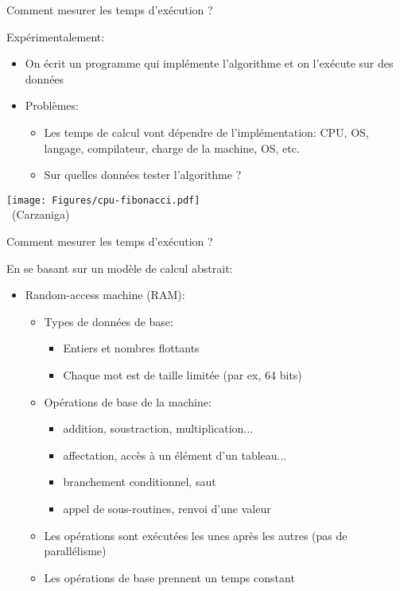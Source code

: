 \begin{frame}{Comment mesurer les temps d'exécution ?}

Expérimentalement:
\begin{itemize}
\item On écrit un programme qui implémente l'algorithme et on l'exécute sur des données
\item Problèmes:
\begin{itemize}
\item Les temps de calcul vont dépendre de l'implémentation: CPU, OS, langage, compilateur, charge de la machine, OS, etc.
\item Sur quelles données tester l'algorithme ?
\end{itemize}
\end{itemize}

\begin{center}
\texttt{[image: Figures/cpu-fibonacci.pdf]}\\
~\hfill\scriptsize(Carzaniga)
\end{center}

\end{frame}

\begin{frame}{Comment mesurer les temps d'exécution ?}

En se basant sur un modèle de calcul abstrait:
\begin{itemize}
\item Random-access machine (RAM):
\begin{itemize}
\item Types de données de base:
\begin{itemize}
\item Entiers et nombres flottants
\item Chaque mot est de taille limitée (par ex, 64 bits)
\end{itemize}
\item Opérations de base de la machine:
\begin{itemize}
\item addition, soustraction, multiplication...
\item affectation, accès à un élément d'un tableau...
\item branchement conditionnel, saut
\item appel de sous-routines, renvoi d'une valeur
\end{itemize}
\item Les opérations sont exécutées les unes après les autres (pas de parallélisme)
\item \alert{Les opérations de base prennent un temps constant}
\end{itemize}
\end{itemize}
\end{frame}

